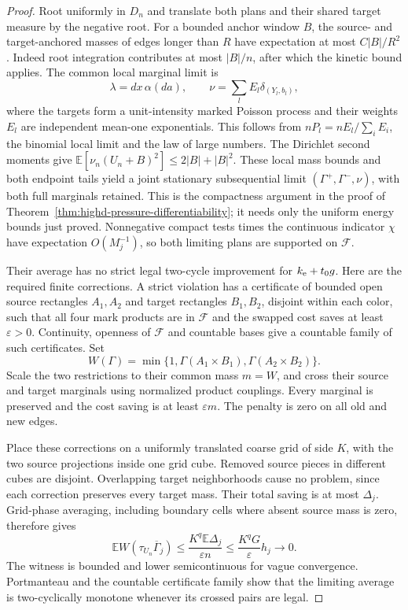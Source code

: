 \documentclass[11pt,reqno]{amsart}
\theoremstyle{definition}
\theoremstyle{remark}
\numberwithin{equation}{section}
\newcommand{\E}{\mathbb E}
\begin{document}
\begin{proof}
Root uniformly in \(D_n\) and translate both plans and their shared
target measure by the negative root. For a bounded anchor window \(B\),
the source- and target-anchored masses of edges longer than \(R\) have
expectation at most \(C|B|/R^2\). Indeed root integration contributes
at most \(|B|/n\), after which the kinetic bound applies. The common
local marginal limit is
\[
 \lambda=dx\,\alpha(da),\qquad
 \nu=\sum_l E_l\delta_{(Y_l,b_l)},
\]
where the targets form a unit-intensity marked Poisson process and their
weights \(E_l\) are independent mean-one exponentials. This follows
from \(nP_l=nE_l/\sum_iE_i\), the binomial local limit and the law of
large numbers. The Dirichlet second moments give
\(\E[\nu_n(U_n+B)^2]\le2|B|+|B|^2\).
These local mass bounds and both endpoint tails yield a joint stationary
subsequential limit \((\Gamma^+,\Gamma^-,\nu)\), with both full
marginals retained. This is the compactness argument in the proof of
Theorem~\ref{thm:highd-pressure-differentiability}; it needs only the
uniform energy bounds just proved. Nonnegative compact tests times the
continuous indicator \(\chi\) have expectation \(O(M_j^{-1})\),
so both limiting plans are supported on \(\mathcal F\).

Their average has no strict legal two-cycle improvement for
\(k_{\rm e}+t_0g\). Here are the required finite corrections. A strict
violation has a certificate of bounded open source rectangles \(A_1,A_2\)
and target rectangles \(B_1,B_2\), disjoint within each color, such that
all four mark products are in \(\mathcal F\) and the swapped cost saves
at least \(\varepsilon>0\). Continuity, openness of \(\mathcal F\)
and countable bases give a countable family of such certificates. Set
\[
 W(\Gamma)=\min\{1,\Gamma(A_1\times B_1),\Gamma(A_2\times B_2)\}.
\]
Scale the two restrictions to their common mass \(m=W\), and cross
their source and target marginals using normalized product couplings.
Every marginal is preserved and the cost saving is at least
\(\varepsilon m\). The penalty is zero on all old and new edges.

Place these corrections on a uniformly translated coarse grid of side
\(K\), with the two source projections inside one grid cube. Removed
source pieces in different cubes are disjoint. Overlapping target
neighborhoods cause no problem, since each correction preserves every
target mass. Their total saving is at most \(\Delta_j\). Grid-phase
averaging, including boundary cells where absent source mass is zero,
therefore gives
\[
 \E W(\tau_{U_n}\overline\Gamma_j)
       \le\frac{K^q\E\Delta_j}{\varepsilon n}
       \le\frac{K^qG}{\varepsilon}h_j\longrightarrow0.
\]
The witness is bounded and lower semicontinuous for vague convergence.
Portmanteau and the countable certificate family show that the limiting
average is two-cyclically monotone whenever its crossed pairs are legal.


\end{proof}
\end{document}
